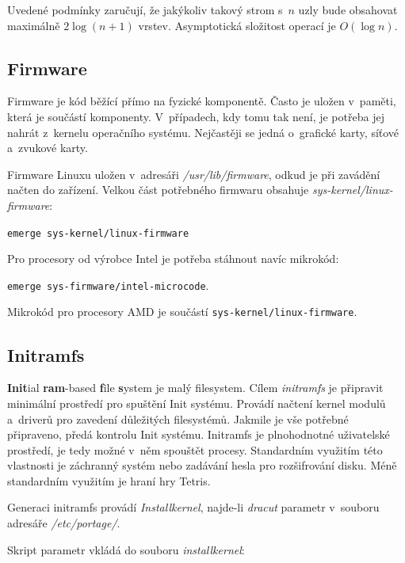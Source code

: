 \documentclass[12pt,a4paper,twoside,]{article}
\begin{document}
{{{{{{{\hspace*{-1.5em}Uvedené podmínky zaručují, že jakýkoliv takový strom s~$n$ uzly bude obsahovat \\maximálně $2\log(n+1)$ vrstev. Asymptotická složitost operací je $O(\log n)$.\\



\subsection{\textsf{Firmware}}
Firmware je kód běžící přímo na fyzické komponentě. Často je uložen v~paměti, která je součástí komponenty. V~případech, kdy tomu tak není, je potřeba jej nahrát z~kernelu operačního systému. Nejčastěji se jedná o~grafické karty, síťové a~zvukové karty. 

Firmware Linuxu uložen v~adresáři \textit{/usr/lib/firmware}, odkud je při zavádění načten do zařízení. Velkou část potřebného firmwaru obsahuje \textit{sys-kernel/linux-firmware}:

\texttt{emerge sys-kernel/linux-firmware}

\hspace{-1.5em}Pro procesory od výrobce Intel je potřeba stáhnout navíc mikrokód:

\texttt{emerge sys-firmware/intel-microcode}. 

\hspace{-1.5em}Mikrokód pro procesory AMD je součástí  \texttt{sys-kernel/linux-firmware}.
\subsection{\textsf{Initramfs}} \hypertarget{Initramfs}{}
{\bf Init}ial {\bf ram}-based {\bf f}ile {\bf s}ystem je malý filesystem. Cílem \textit{initramfs} je připravit minimální prostředí pro spuštění Init systému. Provádí načtení kernel modulů a~driverů pro zavedení důležitých filesystémů. Jakmile je vše potřebné připraveno, předá kontrolu Init systému.
Initramfs je plnohodnotné uživatelské prostředí, je tedy možné v~něm spouštět procesy. Standardním využitím této vlastnosti je záchranný systém nebo zadávání hesla pro rozšifrování disku. Méně standardním využitím je hraní hry Tetris. 

Generaci initramfs provádí \textit{Installkernel}, najde-li \textit{dracut} parametr v~souboru adresáře \textit{/etc/portage/}.

\hspace{-1.5em}Skript parametr vkládá do souboru \textit{installkernel}:

}}}}}}}
\end{document}
